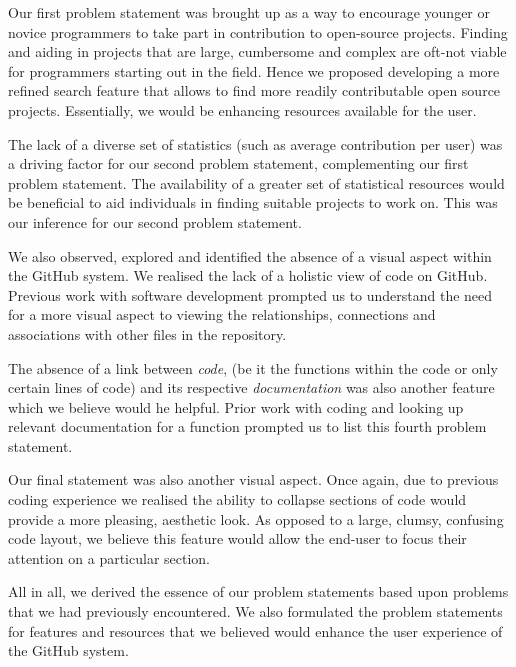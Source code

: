 \documentclass[12pt]{article}
\begin{document}
Our first problem statement was brought up as a way to encourage younger or novice programmers to take part in contribution to open-source projects. Finding and aiding in projects that are large, cumbersome and complex are oft-not viable for programmers starting out in the field. Hence we proposed developing a more refined search feature that allows to find more readily contributable open source projects. Essentially, we would be enhancing resources available for the user.

The lack of a diverse set of statistics (such as average contribution per user) was a driving factor for our second problem statement, complementing our first problem statement. The availability of a greater set of statistical resources would be beneficial to aid individuals in finding suitable projects to work on. This was our inference for our second problem statement.

We also observed, explored and identified the absence of a visual aspect within the \textsf{GitHub} system. We realised the lack of a holistic view of code on \textsf{GitHub}. Previous work with software development prompted us to understand the need for a more visual aspect to viewing the relationships, connections and associations with other files in the repository.

The absence of a link between \textit{code}, (be it the functions within the code or only certain lines of code) and its respective \textit{documentation} was also another feature which we believe would he helpful. Prior work with coding and looking up relevant documentation for a function prompted us to list this fourth problem statement.

Our final statement was also another visual aspect. Once again, due to previous coding experience we realised the ability to collapse sections of code would provide a more pleasing, aesthetic look. As opposed to a large, clumsy, confusing code layout, we believe this feature would allow the end-user to focus their attention on a particular section.

All in all, we derived the essence of our problem statements based upon problems that we had previously encountered. We also formulated the problem statements for features and resources that we believed would enhance the user experience of the \textsf{GitHub} system.
\end{document}
